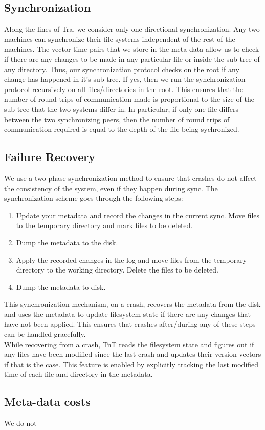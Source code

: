 \subsection{Synchronization}
Along the lines of Tra, we consider only one-directional synchronization. Any two machines can synchronize their file systems independent of the rest of the machines. The vector time-pairs that we store in the meta-data allow us to check if there are any changes to be made in any particular file or inside the sub-tree of any directory. Thus, our synchronization protocol checks on the root if any change has happened in it's sub-tree. If yes, then we run the synchronization protocol recursively on all files/directories in the root. This ensures that the number of round trips of communication made is proportional to the size of the sub-tree that the two systems differ in. In particular, if only one file differs between the two synchronizing peers, then the number of round trips of communication required is equal to the depth of the file being sychronized.

\subsection{Failure Recovery} \label{subsec:failure}
We use a two-phase synchronization method to ensure that crashes do not affect the consistency of the system, even if they happen during sync. The synchronization scheme goes through the following steps:
\begin{enumerate}
\item Update your metadata and record the changes in the current sync. Move files to the temporary directory and mark files to be deleted.
\item Dump the metadata to the disk.
\item Apply the recorded changes in the log and move files from the temporary directory to the working directory. Delete the files to be deleted.
\item Dump the metadata to disk.
\end{enumerate}
This synchronization mechanism, on a crash, recovers the metadata from the disk and uses the metadata to update filesystem state if there are any changes that have not been applied. This ensures that crashes after/during any of these steps can be handled gracefully.\\
While recovering from a crash, TnT reads the filesystem state and figures out if any files have been modified since the last crash and updates their version vectors if that is the case. This feature is enabled by explicitly tracking the last modified time of each file and directory in the metadata.

\subsection{Meta-data costs}
We do not

